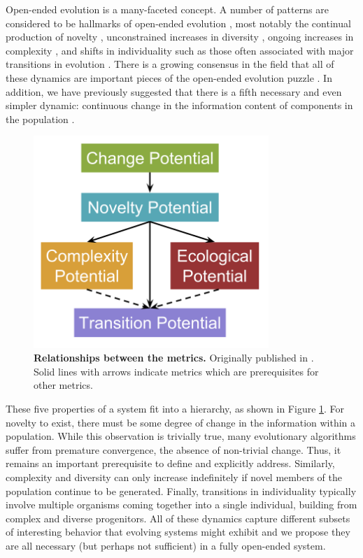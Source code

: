 \documentclass[letterpaper]{article}
\begin{document}
Open-ended evolution is a many-faceted concept. A number of patterns are considered to be hallmarks of open-ended evolution \citep{taylor_open-ended_2016}, most notably the continual production of novelty \citep{lehman_abandoning_2011, banzhaf_defining_2016}, unconstrained increases in diversity \citep{bedau_bifurcation_1994}, ongoing increases in complexity \citep{lenski_evolutionary_2003, korb_evolution_2011}, and shifts in individuality such as those often associated with major transitions in evolution \citep{maynard_smith_major_1997}. There is a growing consensus in the field that all of these dynamics are important pieces of the open-ended evolution puzzle \citep{taylor_open-ended_2016}. In addition, we have previously suggested that there is a fifth necessary and even simpler dynamic: continuous change in the
information content of components in the
population \citep{dolson_whats_2015}.

\begin{figure}
    \centering
\includegraphics[width=3.5in]{figs/dolson.Complexity_Barriers.png}
\caption{\textbf{Relationships between the metrics.} Originally published in \citep{dolson_whats_2015}. Solid lines with arrows indicate metrics which are prerequisites for other metrics.\label{hierarchy}}
\end{figure}

These five properties of a system fit into a hierarchy, as shown in Figure \ref{hierarchy}. For novelty to exist, there must be some degree of change in the information within a population. While this observation is trivially true, many evolutionary algorithms suffer from premature convergence, the absence of non-trivial change. Thus, it remains an important prerequisite to define and explicitly address. Similarly, complexity and diversity can only increase indefinitely if novel members of the population continue to be generated. Finally, transitions in individuality typically involve multiple organisms coming together into a single individual, building from complex and diverse progenitors.  All of these dynamics capture different subsets of interesting behavior that evolving systems might exhibit and we propose they are all necessary (but perhaps not sufficient) in a fully open-ended system.
\end{document}
